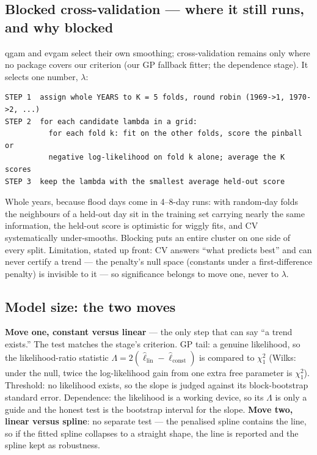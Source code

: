 \documentclass[11pt]{article}
\begin{document}
\subsection{Blocked cross-validation --- where it still runs, and why blocked}

qgam and evgam select their own smoothing; cross-validation remains only
where no package covers our criterion (our GP fallback fitter; the
dependence stage). It selects one number, $\lambda$:

\begin{Verbatim}[fontsize=\small]
STEP 1  assign whole YEARS to K = 5 folds, round robin (1969->1, 1970->2, ...)
STEP 2  for each candidate lambda in a grid:
          for each fold k: fit on the other folds, score the pinball or
          negative log-likelihood on fold k alone; average the K scores
STEP 3  keep the lambda with the smallest average held-out score
\end{Verbatim}

Whole years, because flood days come in 4--8-day runs: with random-day folds
the neighbours of a held-out day sit in the training set carrying nearly the
same information, the held-out score is optimistic for wiggly fits, and CV
systematically under-smooths. Blocking puts an entire cluster on one side of
every split. Limitation, stated up front: CV answers ``what predicts best''
and can never certify a trend --- the penalty's null space (constants under a
first-difference penalty) is invisible to it --- so significance belongs to
move one, never to $\lambda$.

\subsection{Model size: the two moves}

\textbf{Move one, constant versus linear} --- the only step that can say ``a
trend exists.'' The test matches the stage's criterion. GP tail: a genuine
likelihood, so the likelihood-ratio statistic
$\Lambda = 2(\hat\ell_{\text{lin}} - \hat\ell_{\text{const}})$ is compared to
$\chi^2_1$ (Wilks: under the null, twice the log-likelihood gain from one
extra free parameter is $\chi^2_1$). Threshold: no likelihood exists, so the
slope is judged against its block-bootstrap standard error. Dependence: the
likelihood is a working device, so its $\Lambda$ is only a guide and the
honest test is the bootstrap interval for the slope. \textbf{Move two, linear
versus spline}: no separate test --- the penalised spline contains the line,
so if the fitted spline collapses to a straight shape, the line is reported
and the spline kept as robustness.
\end{document}
